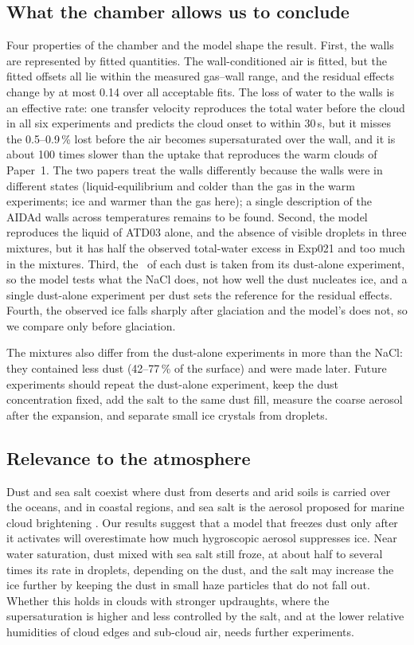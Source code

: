 \subsection{What the chamber allows us to conclude}

Four properties of the chamber and the model shape the result. First, the walls are represented by fitted quantities. The wall-conditioned air is fitted, but the fitted offsets all lie within the measured gas--wall range, and the residual effects change by at most 0.14 over all acceptable fits. The loss of water to the walls is an effective rate: one transfer velocity reproduces the total water before the cloud in all six experiments and predicts the cloud onset to within 30\,s, but it misses the 0.5--0.9\,\% lost before the air becomes supersaturated over the wall, and it is about 100 times slower than the uptake that reproduces the warm clouds of Paper~1. The two papers treat the walls differently because the walls were in different states (liquid-equilibrium and colder than the gas in the warm experiments; ice and warmer than the gas here); a single description of the AIDAd walls across temperatures remains to be found. Second, the model reproduces the liquid of ATD03 alone, and the absence of visible droplets in three mixtures, but it has half the observed total-water excess in Exp021 and too much in the mixtures. Third, the \ns\ of each dust is taken from its dust-alone experiment, so the model tests what the NaCl does, not how well the dust nucleates ice, and a single dust-alone experiment per dust sets the reference for the residual effects. Fourth, the observed ice falls sharply after glaciation and the model's does not, so we compare only before glaciation.

The mixtures also differ from the dust-alone experiments in more than the NaCl: they contained less dust (42--77\,\% of the surface) and were made later. Future experiments should repeat the dust-alone experiment, keep the dust concentration fixed, add the salt to the same dust fill, measure the coarse aerosol after the expansion, and separate small ice crystals from droplets. 

\subsection{Relevance to the atmosphere}

Dust and sea salt coexist where dust from deserts and arid soils is carried over the oceans, and in coastal regions, and sea salt is the aerosol proposed for marine cloud brightening \citep{Connolly2014}. Our results suggest that a model that freezes dust only after it activates will overestimate how much hygroscopic aerosol suppresses ice. Near water saturation, dust mixed with sea salt still froze, at about half to several times its rate in droplets, depending on the dust, and the salt may increase the ice further by keeping the dust in small haze particles that do not fall out. Whether this holds in clouds with stronger updraughts, where the supersaturation is higher and less controlled by the salt, and at the lower relative humidities of cloud edges and sub-cloud air, needs further experiments.

